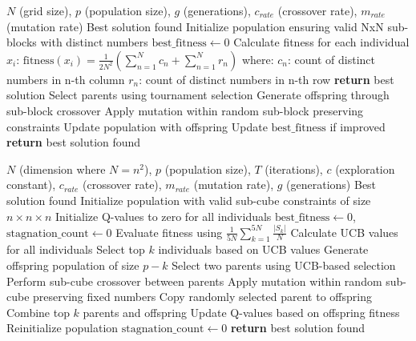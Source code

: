 \documentclass{article}
\begin{document}
\begin{algorithm}
\caption{GA for Traditional 2D Sudoku}
\label{alg:ga-2d}
\begin{algorithmic}
\REQUIRE $N$ (grid size), $p$ (population size), $g$ (generations), $c_{rate}$ (crossover rate), $m_{rate}$ (mutation rate)
\ENSURE Best solution found
\STATE Initialize population ensuring valid NxN sub-blocks with distinct numbers
\STATE $\text{best\_fitness} \leftarrow 0$
\STATE Calculate fitness for each individual $x_i$:
\STATE $\text{fitness}(x_i) = \frac{1}{2N^2}\left(\sum_{n=1}^{N} c_n + \sum_{n=1}^{N} r_n\right)$
\STATE where:
\STATE $c_n$: count of distinct numbers in n-th column
\STATE $r_n$: count of distinct numbers in n-th row
\STATE \textbf{return} best solution
\ENDIF
\STATE Select parents using tournament selection
\STATE Generate offspring through sub-block crossover
\STATE Apply mutation within random sub-block preserving constraints
\ENDIF
\ENDFOR
\ENDIF
\STATE Update population with offspring
\STATE Update $\text{best\_fitness}$ if improved
\ENDFOR
\STATE \textbf{return} best solution found
\end{algorithmic}
\end{algorithm}
\begin{algorithm}
\caption{GA-UCB for N\times N\times N Sudoku}
\label{alg:ga-ucb}
\begin{algorithmic}
\REQUIRE $N$ (dimension where $N=n^2$), $p$ (population size), $T$ (iterations), $c$ (exploration constant), $c_{rate}$ (crossover rate), $m_{rate}$ (mutation rate), $g$ (generations)
\ENSURE Best solution found
\STATE Initialize population with valid sub-cube constraints of size $n \times n \times n$
\STATE Initialize Q-values to zero for all individuals
\STATE $\text{best\_fitness} \leftarrow 0$, $\text{stagnation\_count} \leftarrow 0$
\STATE Evaluate fitness using $\frac{1}{5N}\sum_{k=1}^{5N} \frac{|S_k|}{N}$
\STATE Calculate UCB values for all individuals
\STATE Select top $k$ individuals based on UCB values
\STATE Generate offspring population of size $p-k$
\STATE Select two parents using UCB-based selection
\STATE Perform sub-cube crossover between parents
\STATE Apply mutation within random sub-cube preserving fixed numbers
\ENDIF
\ELSE
\STATE Copy randomly selected parent to offspring
\ENDIF
\ENDFOR
\STATE Combine top $k$ parents and offspring
\STATE Update Q-values based on offspring fitness
\STATE Reinitialize population
\STATE $\text{stagnation\_count} \leftarrow 0$
\ENDIF
\ENDWHILE
\STATE \textbf{return} best solution found
\end{algorithmic}
\end{algorithm}
\end{document}
